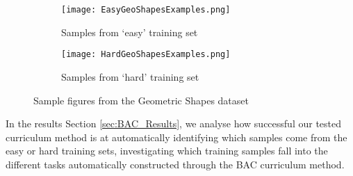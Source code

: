 \begin{figure}
\hspace*{-2cm}    
\centering
\begin{subfigure}{.6\textwidth}
  \centering
  \texttt{[image: EasyGeoShapesExamples.png]}
  \caption{Samples from `easy' training set}
  \label{fig:EasyGeoSamples}
\end{subfigure}%
\begin{subfigure}{.6\textwidth}
  \centering
  \texttt{[image: HardGeoShapesExamples.png]}
  \caption{Samples from `hard' training set}
  \label{fig:HardGeoSamples}
\end{subfigure}
\caption{Sample figures from the Geometric Shapes dataset}
\label{fig:GeoSamples}
\end{figure}

 In the results Section \ref{sec:BAC_Results}, we analyse how successful our tested curriculum method is at automatically identifying which samples come from the easy or hard training sets, investigating which training samples fall into the different tasks automatically constructed through the BAC curriculum method. 

